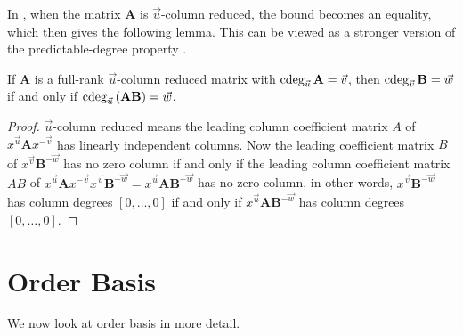 In , when the matrix $\mathbf{A}$
is $\vec{u}$-column reduced, the bound becomes an equality, which
then gives the following lemma. This can be viewed as a stronger version
of the predictable-degree property \citep{kailath:1980}.
\begin{lem}
\label{lem:predictableDegree}If $\mathbf{A}$ is a full-rank $\vec{u}$-column
reduced matrix with $\cdeg_{\vec{u}}\mathbf{A}=\vec{v}$, then $\cdeg_{\vec{v}}\mathbf{B}=\vec{w}$
if and only if $\cdeg_{\vec{u}}\left(\mathbf{A}\mathbf{B}\right)=\vec{w}$.\end{lem}
\begin{proof}
$\vec{u}$-column reduced means the leading column coefficient matrix
$A$ of $x^{\vec{u}}\mathbf{A}x^{-\vec{v}}$ has linearly independent
columns. Now the leading coefficient matrix $B$ of $x^{\vec{v}}\mathbf{B}^{-\vec{w}}$
has no zero column if and only if the leading column coefficient matrix
$AB$ of $x^{\vec{u}}\mathbf{A}x^{-\vec{v}}x^{\vec{v}}\mathbf{B}^{-\vec{w}}=x^{\vec{u}}\mathbf{A}\mathbf{B}^{-\vec{w}}$
has no zero column, in other words, $x^{\vec{v}}\mathbf{B}^{-\vec{w}}$
has column degrees $\left[0,\dots,0\right]$ if and only if $x^{\vec{u}}\mathbf{A}\mathbf{B}^{-\vec{w}}$
has column degrees $\left[0,\dots,0\right]$.
\end{proof}

\section{Order Basis}

We now look at order basis in more detail.

